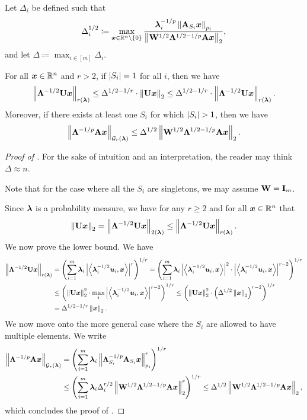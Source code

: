 \documentclass[11pt]{article}
\numberwithin{equation}{section}
\begin{document}
\begin{lemma}
\label{lemma:r_ellipsoid}
Let $\Delta_i$ be defined such that 
\begin{align*}
    \Delta_i^{1/2} \coloneqq \max_{\bm{x}\in\mathbb{R}^n\setminus\left\{0\right\}} \frac{\bm{\lambda}_i^{-1/p}\left\lVert \mathbf{A}_{S_i}\bm{x} \right\rVert_{p_i}}{\left\lVert \mathbf{W}^{1/2}\mathbf{\Lambda}^{1/2-1/p}\mathbf{A}\bm{x} \right\rVert_2},
\end{align*}
and let $\Delta \coloneqq \max_{i \in [m]} \Delta_i$.

For all $\bm{x}\in\mathbb{R}^n$ and $r > 2$, if $\left\lvert S_i \right\rvert = 1$ for all $i$, then we have
\begin{align*}
    \left\lVert \mathbf{\Lambda}^{-1/2}\mathbf{U}\bm{x} \right\rVert_{r(\bm{\lambda})} \le \Delta^{1/2-1/r} \cdot \left\lVert \mathbf{U}\bm{x} \right\rVert_2 \le \Delta^{1/2-1/r} \cdot \left\lVert \mathbf{\Lambda}^{-1/2}\mathbf{U}\bm{x} \right\rVert_{r(\bm{\lambda})}.
\end{align*}
Moreover, if there exists at least one $S_i$ for which $\left\lvert S_i \right\rvert > 1$, then we have
\begin{align*}
    \left\lVert \mathbf{\Lambda}^{-1/p}\mathbf{A}\bm{x} \right\rVert_{\mathcal{G}_{r}(\bm{\lambda})} \le \Delta^{1/2}\left\lVert \mathbf{W}^{1/2}\mathbf{\Lambda}^{1/2-1/p}\mathbf{A}\bm{x} \right\rVert_2.
\end{align*}
\end{lemma}
\begin{proof}[Proof of ]
For the sake of intuition and an interpretation, the reader may think $\Delta \approx n$.

Note that for the case where all the $S_i$ are singletons, we may assume $\mathbf{W} = \mathbf{I}_m$.

Since $\bm{\lambda}$ is a probability measure, we have for any $r \ge 2$ and for all $\bm{x}\in\mathbb{R}^n$ that
\begin{align*}
    \left\lVert \mathbf{U}\bm{x} \right\rVert_2 = \left\lVert \mathbf{\Lambda}^{-1/2}\mathbf{U}\bm{x} \right\rVert_{2(\bm{\lambda})} \le \left\lVert \mathbf{\Lambda}^{-1/2}\mathbf{U}\bm{x} \right\rVert_{r(\bm{\lambda})}.
\end{align*}
We now prove the lower bound. We have
\begin{align*}
    \left\lVert \mathbf{\Lambda}^{-1/2}\mathbf{U}\bm{x} \right\rVert_{r(\bm{\lambda})} &= \left(\sum_{i=1}^m \bm{\lambda}_i\left\lvert \left\langle \bm{\lambda}_i^{-1/2}\bm{u}_i,\bm{x} \right\rangle \right\rvert^{r}\right)^{1/r} =  \left(\sum_{i=1}^m \bm{\lambda}_i\left\lvert \left\langle \bm{\lambda}_i^{-1/2}\bm{u}_i,\bm{x} \right\rangle \right\rvert^{2}\cdot\left\lvert \left\langle \bm{\lambda}_i^{-1/2}\bm{u}_i,\bm{x} \right\rangle \right\rvert^{r-2}\right)^{1/r} \\
    &\le \left(\left\lVert \mathbf{U}\bm{x} \right\rVert_2^2 \cdot \max_i \left\lvert \left\langle \bm{\lambda}_i^{-1/2}\bm{u}_i,\bm{x} \right\rangle \right\rvert^{r-2}\right)^{1/r} \le \left(\left\lVert \mathbf{U}\bm{x} \right\rVert_2^2 \cdot \left(\Delta^{1/2}\left\lVert \bm{x} \right\rVert_2\right)^{r-2}\right)^{1/r} \\
    &= \Delta^{1/2-1/r} \left\lVert \bm{x} \right\rVert_2.
\end{align*}
We now move onto the more general case where the $S_i$ are allowed to have multiple elements. We write
\begin{align*}
    \left\lVert \mathbf{\Lambda}^{-1/p}\mathbf{A}\bm{x} \right\rVert_{\mathcal{G}_{r}(\bm{\lambda})} &= \left(\sum_{i=1}^m \bm{\lambda}_i\left\lVert \mathbf{\Lambda}_{S_i}^{-1/p}\mathbf{A}_{S_i}\bm{x} \right\rVert_{p_i}^r\right)^{1/r} \\
    &\le \left(\sum_{i=1}^m \bm{\lambda}_i\Delta_i^{r/2}\left\lVert \mathbf{W}^{1/2}\mathbf{\Lambda}^{1/2-1/p}\mathbf{A}\bm{x} \right\rVert_{2}^{r}\right)^{1/r} \le \Delta^{1/2}\left\lVert \mathbf{W}^{1/2}\mathbf{\Lambda}^{1/2-1/p}\mathbf{A}\bm{x} \right\rVert_2,
\end{align*}
which concludes the proof of .
\end{proof}
\end{document}

